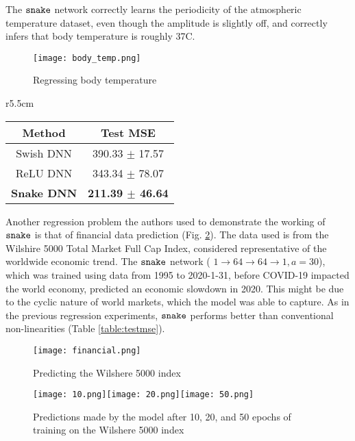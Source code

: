 The $ \operatorname{\texttt{snake}} $ network correctly learns the periodicity of the atmospheric temperature dataset, even though the amplitude is slightly off, and correctly infers that body temperature is roughly 37\degree C. \\

\begin{figure}[h]
  \begin{center}
    \texttt{[image: body\_temp.png]}
  \end{center}
  \caption{Regressing body temperature}
  \label{fig:body_temp}
\end{figure}

\newpage

\begin{wraptable}{r}{5.5cm}
  \begin{center}
\begin{tabular}{ |c|c| }
 \hline
    Method & Test MSE \\
    \hline
    Swish DNN & 390.33 $\pm$ 17.57 \\
	ReLU DNN & 343.34 $\pm$ 78.07 \\
	\textbf{Snake DNN} & \textbf{211.39 $\pm$ 46.64} \\
 \hline
\end{tabular}
\end{center}
  \caption{Prediction of Wilshere 5000 index}
  \label{table:testmse}
\end{wraptable}

Another regression problem the authors used to demonstrate the working of $ \operatorname{\texttt{snake}} $ is that of financial data prediction (Fig. \ref{fig:financial}). The data used is from the Wilshire 5000 Total Market Full Cap Index, considered representative of the worldwide economic trend. The $ \operatorname{\texttt{snake}} $ network ( $ 1 \rightarrow 64 \rightarrow 64 \rightarrow 1, a = 30 $), which was trained using data from 1995 to 2020-1-31, before COVID-19 impacted the world economy, predicted an economic slowdown in 2020. This might be due to the cyclic nature of world markets, which the model was able to capture. As in the previous regression experiments, $ \operatorname{\texttt{snake}} $ performs better than conventional non-linearities (Table \ref{table:testmse}).

\begin{figure}[h]
  \centering
  \texttt{[image: financial.png]}
  \caption{Predicting the Wilshere 5000 index}
  \label{fig:financial}
\end{figure}

\begin{figure}[h]
  \centering
  \texttt{[image: 10.png]}\texttt{[image: 20.png]}\texttt{[image: 50.png]}
  \caption{Predictions made by the model after 10, 20, and 50 epochs of training on the Wilshere 5000 index }
  \label{fig:preds_fin}
\end{figure}

